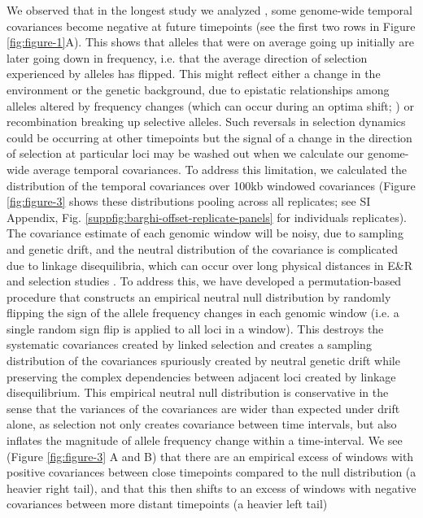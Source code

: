 \documentclass[9pt,twocolumn,twoside]{pnas-new}
\begin{document}
We observed that in the longest study  we analyzed \cite{Barghi2019-qy},
some genome-wide temporal covariances become negative at future timepoints (see
the first two rows in Figure \ref{fig:figure-1}A). This shows that alleles that
were on average going up initially are later going down in frequency, i.e.
that the average direction of selection experienced by alleles has flipped.
This might reflect either a change in the environment or the genetic
background, due to epistatic relationships among alleles altered by frequency
changes (which can occur during an optima shift; \cite{Hayward2019-kt}) or
recombination breaking up selective alleles. Such reversals in selection
dynamics could be occurring at other timepoints but the signal of a change in
the direction of selection at particular loci may be washed out when we
calculate our genome-wide average temporal covariances.  To address this
limitation, we calculated the distribution of the temporal covariances over
100kb windowed covariances (Figure \ref{fig:figure-3} shows these distributions
pooling across all replicates; see SI Appendix, Fig.
\ref{suppfig:barghi-offset-replicate-panels} for individuals replicates). The
covariance estimate of each genomic window will be noisy, due to sampling and
genetic drift, and the neutral distribution of the covariance is complicated
due to linkage disequilibria, which can occur over long physical distances in
E\&R and selection studies \cite{Nuzhdin2013-gf,Baldwin-Brown2014-cl}.  To
address this, we have developed a permutation-based procedure that constructs
an empirical neutral null distribution by randomly flipping the sign of
the allele frequency changes in each genomic window (i.e. a single random sign
flip is applied to all loci in a window). This destroys the systematic
covariances created by linked selection and creates a sampling distribution of
the covariances spuriously created by neutral genetic drift while preserving
the complex dependencies between adjacent loci created by linkage
disequilibrium.  This empirical neutral null distribution is conservative in
the sense that the variances of the covariances are wider than expected under
drift alone, as selection not only creates covariance between time
intervals, but also inflates the magnitude of allele frequency change within a
time-interval.  We see (Figure \ref{fig:figure-3} A and B) that there are an
empirical excess of windows with positive covariances between close timepoints
compared to the null distribution (a heavier right tail), and that this then
shifts to an excess of windows with negative covariances between more distant
timepoints (a heavier left tail)
\end{document}
